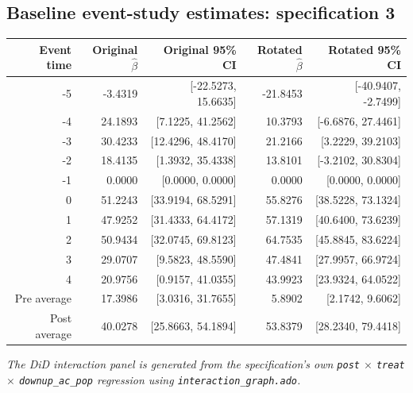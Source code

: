 \documentclass[10pt]{article}
\begin{document}
\subsection*{Baseline event-study estimates: specification 3}
\begin{center}
\scriptsize
\begin{tabular}{r rr rr}
\toprule
Event time & Original $\hat\beta$ & Original 95\% CI & Rotated $\hat\beta$ & Rotated 95\% CI \\
\midrule
-5 & -3.4319 & [-22.5273, 15.6635] & -21.8453 & [-40.9407, -2.7499] \\
-4 & 24.1893 & [7.1225, 41.2562] & 10.3793 & [-6.6876, 27.4461] \\
-3 & 30.4233 & [12.4296, 48.4170] & 21.2166 & [3.2229, 39.2103] \\
-2 & 18.4135 & [1.3932, 35.4338] & 13.8101 & [-3.2102, 30.8304] \\
-1 & 0.0000 & [0.0000, 0.0000] & 0.0000 & [0.0000, 0.0000] \\
0 & 51.2243 & [33.9194, 68.5291] & 55.8276 & [38.5228, 73.1324] \\
1 & 47.9252 & [31.4333, 64.4172] & 57.1319 & [40.6400, 73.6239] \\
2 & 50.9434 & [32.0745, 69.8123] & 64.7535 & [45.8845, 83.6224] \\
3 & 29.0707 & [9.5823, 48.5590] & 47.4841 & [27.9957, 66.9724] \\
4 & 20.9756 & [0.9157, 41.0355] & 43.9923 & [23.9324, 64.0522] \\
\midrule
Pre average & 17.3986 & [3.0316, 31.7655] & 5.8902 & [2.1742, 9.6062] \\
Post average & 40.0278 & [25.8663, 54.1894] & 53.8379 & [28.2340, 79.4418] \\
\bottomrule
\end{tabular}
\end{center}
\medskip
\textit{The DiD interaction panel is generated from the specification's own \texttt{post} $\times$ \texttt{treat} $\times$ \texttt{downup\_ac\_pop} regression using \texttt{interaction\_graph.ado}.}
\clearpage
\end{document}
